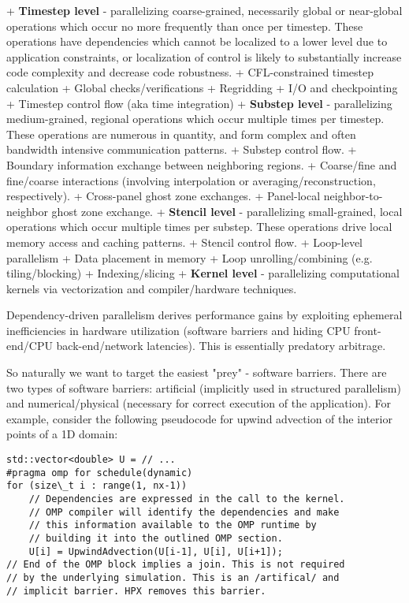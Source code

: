 \documentclass[final,letterpaper,10pt]{article}
\begin{document}

+ \textbf{Timestep level} - parallelizing coarse-grained, necessarily global or near-global operations which occur no more frequently than once per timestep. These operations have dependencies which cannot be localized to a lower level due to application constraints, or localization of control is likely to substantially increase code complexity and decrease code robustness.
   + CFL-constrained timestep calculation
   + Global checks/verifications
   + Regridding
   + I/O and checkpointing
   + Timestep control flow (aka time integration) 
+ \textbf{Substep level} - parallelizing medium-grained, regional operations which occur multiple times per timestep. These operations are numerous in quantity, and form complex and often bandwidth intensive communication patterns.
   + Substep control flow.
   + Boundary information exchange between neighboring regions.
      + Coarse/fine and fine/coarse interactions (involving interpolation or averaging/reconstruction, respectively).
      + Cross-panel ghost zone exchanges.
      + Panel-local neighbor-to-neighbor ghost zone exchange.
+ \textbf{Stencil level} - parallelizing small-grained, local operations which occur multiple times per substep. These operations drive local memory access and caching patterns.
   + Stencil control flow.
   + Loop-level parallelism
      + Data placement in memory
      + Loop unrolling/combining (e.g. tiling/blocking)
      + Indexing/slicing
+ \textbf{Kernel level} - parallelizing computational kernels via vectorization and compiler/hardware techniques.

Dependency-driven parallelism derives performance gains by exploiting ephemeral inefficiencies in hardware utilization (software barriers and hiding CPU front-end/CPU back-end/network latencies). This is essentially predatory arbitrage.

So naturally we want to target the easiest "prey" - software barriers. There
are two types of software barriers: artificial (implicitly used in structured
parallelism) and numerical/physical (necessary for correct execution of the
application).  For example, consider the following pseudocode for upwind
advection of the interior points of a 1D domain:

\begin{lstlisting}
std::vector<double> U = // ...
#pragma omp for schedule(dynamic)
for (size\_t i : range(1, nx-1))
    // Dependencies are expressed in the call to the kernel.
    // OMP compiler will identify the dependencies and make
    // this information available to the OMP runtime by
    // building it into the outlined OMP section.
    U[i] = UpwindAdvection(U[i-1], U[i], U[i+1]); 
// End of the OMP block implies a join. This is not required
// by the underlying simulation. This is an /artifical/ and
// implicit barrier. HPX removes this barrier. 
\end{lstlisting}
\end{document}
